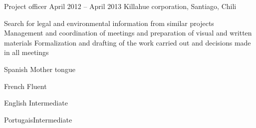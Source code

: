 \begin{joblist}
\item[Project officer]{April 2012 -- April 2013 }
	{Killahue corporation, Santiago, Chili}     
	{
		\iftbftiny \setlength{\parskip}{-10pt} \fi
		\begin{itemize}
			  \iftbftiny \setlength\itemsep{-3pt} \fi
			  \cvitem[\checkmark] Search for legal and environmental information from similar projects
			  \cvitem[\checkmark] Management and coordination of meetings and preparation of visual and written materials
			  \cvitem[\checkmark] Formalization and drafting of the work carried out and decisions made in all meetings
		\end{itemize}      
	}
  
       

   

\end{joblist}


%
%


\begin{skilllist}

\begin{languagelist}
	\item{Spanish} 	{Mother tongue}	
	\item{French} 	{Fluent}	
	\item{English}  {Intermediate}	
	\item{Portugais}{Intermediate}
\end{languagelist}





\end{skilllist}





